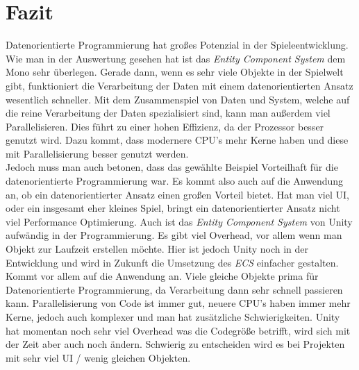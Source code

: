 \section{Fazit}
Datenorientierte Programmierung hat großes Potenzial in der Spieleentwicklung. Wie man in der Auswertung gesehen hat ist das \textit{Entity Component System} dem Mono sehr überlegen. Gerade dann, wenn es sehr viele Objekte in der Spielwelt gibt, funktioniert die Verarbeitung der Daten mit einem datenorientierten Ansatz wesentlich schneller. Mit dem Zusammenspiel von Daten und System, welche auf die reine Verarbeitung der Daten spezialisiert sind, kann man außerdem viel Parallelisieren. Dies führt zu einer hohen Effizienz, da der Prozessor besser genutzt wird. Dazu kommt, dass modernere CPU's mehr Kerne haben und diese mit Parallelisierung besser genutzt werden.\\
Jedoch muss man auch betonen, dass das gewählte Beispiel Vorteilhaft für die datenorientierte Programmierung war. Es kommt also auch auf die Anwendung an, ob ein datenorientierter Ansatz einen großen Vorteil bietet. Hat man viel UI, oder ein insgesamt eher kleines Spiel, bringt ein datenorientierter Ansatz nicht viel Performance Optimierung. Auch ist das \textit{Entity Component System} von Unity aufwändig in der Programmierung. Es gibt viel Overhead, vor allem wenn man Objekt zur Laufzeit erstellen möchte. Hier ist jedoch Unity noch in der Entwicklung und wird in Zukunft die Umsetzung des \textit{ECS} einfacher gestalten.\\
Kommt vor allem auf die Anwendung an. Viele gleiche Objekte prima für Datenorientierte Programmierung, da Verarbeitung dann sehr schnell passieren kann. Parallelisierung von Code ist immer gut, neuere CPU's haben immer mehr Kerne, jedoch auch komplexer und man hat zusätzliche Schwierigkeiten. Unity hat momentan noch sehr viel Overhead was die Codegröße betrifft, wird sich mit der Zeit aber auch noch ändern. Schwierig zu entscheiden wird es bei Projekten mit sehr viel UI / wenig gleichen Objekten.